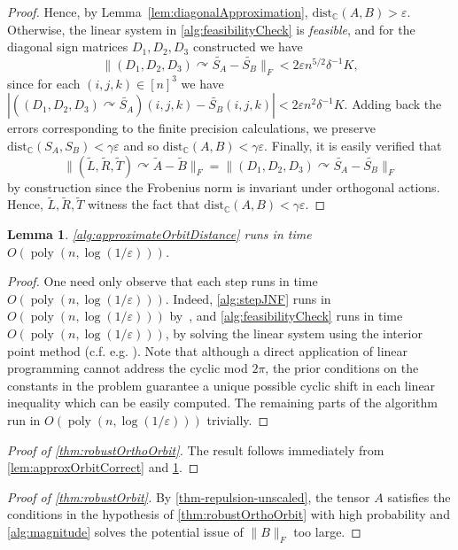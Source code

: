 \documentclass[11pt]{article}
\numberwithin{equation}{section}
\newtheorem{lemma}[theorem]{Lemma}
\theoremstyle{remark}
\DeclareMathOperator{\poly}{poly}
\newcommand{\C}{\mathbb{C}}
\newcommand{\dist}{\mathrm{dist}}
\newcommand{\CC}{\mathbb{C}}
\begin{document}
\begin{proof}
Hence, by Lemma~\ref{lem:diagonalApproximation}, $\dist_{\CC}(A,B)>\varepsilon$. 
Otherwise, the linear system in \ref{alg:feasibilityCheck} is \emph{feasible},
and for the diagonal sign matrices $D_1,D_2,D_3$ constructed we have 
\[\|(D_1,D_2,D_3)\curvearrowright\widetilde{S_A}-\widetilde{S_B}\|_F<2\varepsilon n^{5/2}\delta^{-1}K,\] since
for each $(i,j,k)\in [n]^3$ we have 
$|((D_1,D_2,D_3)\curvearrowright\widetilde{S_A})(i,j,k)-\widetilde{S_B}(i,j,k)|<2\varepsilon n^2\delta^{-1}K$.
Adding back the errors corresponding to the finite precision calculations, 
we preserve $\dist_\C(S_A,S_B)<\gamma\varepsilon$ and so $\dist_\C(A,B)<\gamma\varepsilon$.
Finally, it is easily verified that 
\[\|(\widetilde{L},\widetilde{R},\widetilde{T})\curvearrowright \widetilde{A}-\widetilde{B}\|_F=\|(D_1,D_2,D_3)\curvearrowright\widetilde{S_A}-\widetilde{S_B}\|_F\]
by construction since the Frobenius norm is invariant under orthogonal actions. Hence, $\widetilde{L},\widetilde{R},\widetilde{T}$ witness
the fact that $\dist_\C(A,B)<\gamma\varepsilon$.
\end{proof}

\begin{lemma}\label{lem:approxOrbitEfficient}
\cref{alg:approximateOrbitDistance} runs in time $O(\poly(n,\log(1/\varepsilon)))$.
\end{lemma}
\begin{proof}
One need only observe
that each step runs in time $O(\poly(n,\log(1/\varepsilon)))$. Indeed, 
\ref{alg:stepJNF} runs in $O(\poly(n,\log(1/\varepsilon)))$ by~\cite{dey2023bit}, 
and \ref{alg:feasibilityCheck} runs in time $O(\poly(n,\log(1/\varepsilon)))$,
by solving the linear system using the interior point method (c.f. e.g. \cite{karmarkar1984}). Note that although a direct application of linear programming cannot address the cyclic mod $2\pi$, the prior conditions on the constants in the problem guarantee a unique possible cyclic shift in each linear inequality which can be easily computed. 
The remaining parts of the algorithm run in  $O(\poly(n,\log(1/\varepsilon)))$ trivially.
\end{proof}

\begin{proof}[Proof of \cref{thm:robustOrthoOrbit}]
The result follows immediately from \cref{lem:approxOrbitCorrect} and \cref{lem:approxOrbitEfficient}.
\end{proof}

\begin{proof}[Proof of \cref{thm:robustOrbit}]
By \cref{thm-repulsion-unscaled}, the tensor $A$ satisfies the conditions in the hypothesis of \cref{thm:robustOrthoOrbit} with
high probability and \ref{alg:magnitude} solves the potential issue of $\|B\|_F$ too large.
\end{proof}
\end{document}
